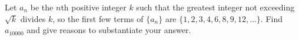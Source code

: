 Let $a_n$ be the $n$th positive integer $k$ such that the greatest integer not
exceeding $\sqrt{k}$ divides $k$, so the first few terms of $\{a_n\}$ are
$\lbrace 1, 2, 3, 4, 6, 8, 9, 12, \dots \rbrace$. Find $a_{10000}$ and give
reasons to substantiate your answer.

